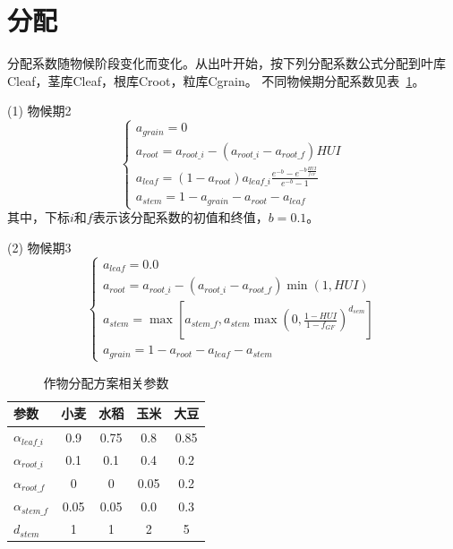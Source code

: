 \section{分配}
分配系数随物候阶段变化而变化。从出叶开始，按下列分配系数公式分配到叶库Cleaf，茎库Cleaf，根库Croot，粒库Cgrain。
不同物候期分配系数见表~\ref{tab:作物分配方案相关参数}。

(1)	物候期2 \\
\begin{equation}
\left\{\begin{array}{c}
  a_{grain}=0 \\ 
  a_{root}=a_{root\_i}-\left(a_{root\_i}-a_{root\_f}\right) HUI \\
  a_{leaf}=\left(1-a_{root}\right) a_{leaf\_i} \frac{{e}^{-{b}}-{e}^{-b \frac{HUI}{f_{GF}}}}{{e}^{-{b}}-1}   \\
  a_{stem}=1-a_{grain}-a_{root}-a_{leaf}
  \end{array}\right.
\end{equation}
其中，下标$i$和$f$表示该分配系数的初值和终值，$b=0.1$。

(2)	物候期3 \\
\begin{equation}
  \left\{\begin{array}{c}
    a_{leaf}=0.0 \\ 
    a_{root}=a_{root\_i}-\left(a_{root\_i}-a_{root\_f}\right) \min(1, HUI) \\
    a_{stem}=\max \left[a_{stem\_f}, a_{stem} \max \left(0, \frac{1-HUI}{1-f_{GF}}\right)^{d_{sem}}\right] \\
    a_{grain}=1-a_{root}-a_{leaf}-a_{stem}
  \end{array}\right.
\end{equation}
\begin{table}[]
  \centering
  \caption{作物分配方案相关参数}
  \label{tab:作物分配方案相关参数}
\begin{tabular}{@{}lcccc@{}}
  \toprule
参数       & 小麦   & 水稻   & 玉米   & 大豆   \\ \midrule
$\alpha_{leaf\_i}$ & 0.9  & 0.75 & 0.8  & 0.85 \\
$\alpha_{root\_i}$ & 0.1  & 0.1  & 0.4  & 0.2  \\
$\alpha_{root\_f}$ & 0    & 0    & 0.05 & 0.2  \\
$\alpha_{stem\_f}$ & 0.05 & 0.05 & 0.0  & 0.3  \\
$d_{stem}$    & 1    & 1    & 2    & 5   \\\bottomrule
\end{tabular}
\end{table}
